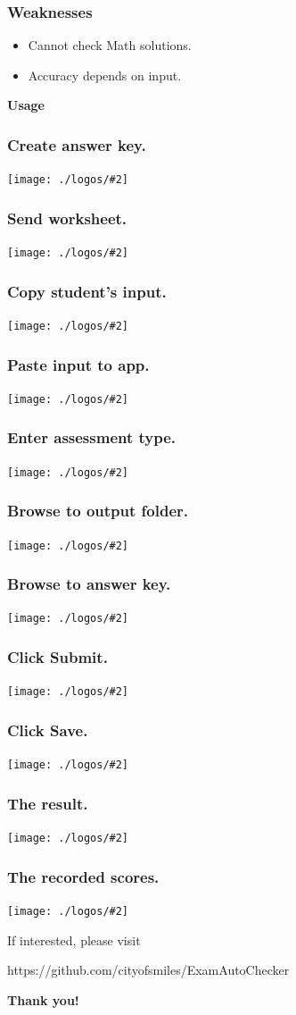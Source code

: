 \documentclass[17pt]{beamer}
\newcommand{\frontpic}[2]{\begin{frame}
		\frametitle{#1}
		\texttt{[image: ./logos/\#2]}
	\end{frame}
}
\begin{document}
    \begin{frame}
    	\frametitle{Weaknesses}
    	\begin{itemize}
    		\item<1-> 
    		Cannot check Math solutions.
    		\item<2-> 
    		Accuracy depends on input.
     	\end{itemize}		
    \end{frame}

    \begin{frame}
    	\begin{center}
    		\textbf{\LARGE Usage}
    	\end{center}		
    \end{frame}

    \frontpic{Create answer key.}{ans-key}
    
    \frontpic{Send worksheet.}{send-worksheet}
    
    \frontpic{Copy student's input.}{copy-input}
    
    \frontpic{Paste input to app.}{paste-to-app}
    
    \frontpic{Enter assessment type.}{type-assessment}
	
	\frontpic{Browse to output folder.}{browse-folder}
	
	\frontpic{Browse to answer key.}{browse-ans-key}
	
	\frontpic{Click Submit.}{submit}
	
	\frontpic{Click Save.}{save}
	
	\frontpic{The result.}{output-folder}
	
	\frontpic{The recorded scores.}{record}
	
    \begin{frame}
    	\begin{center}
    		If interested, please visit
    		
    		\vspace*{1em}
    		
    		\footnotesize{https://github.com/cityofsmiles/ExamAutoChecker}
    	\end{center}
    \end{frame}

    \begin{frame}
    	\begin{center}
    		\textbf{\LARGE Thank you!}
    	\end{center}
    \end{frame}
\end{document}
